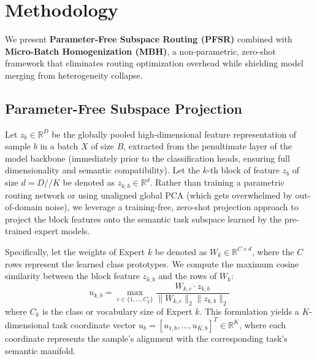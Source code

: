 \section{Methodology}
\label{sec:method}

We present \textbf{Parameter-Free Subspace Routing (PFSR)} combined with \textbf{Micro-Batch Homogenization (MBH)}, a non-parametric, zero-shot framework that eliminates routing optimization overhead while shielding model merging from heterogeneity collapse.

\subsection{Parameter-Free Subspace Projection}
Let $z_b \in \mathbb{R}^D$ be the globally pooled high-dimensional feature representation of sample $b$ in a batch $X$ of size $B$, extracted from the penultimate layer of the model backbone (immediately prior to the classification heads, ensuring full dimensionality and semantic compatibility). Let the $k$-th block of feature $z_b$ of size $d = D//K$ be denoted as $z_{k, b} \in \mathbb{R}^d$. Rather than training a parametric routing network or using unaligned global PCA (which gets overwhelmed by out-of-domain noise), we leverage a training-free, zero-shot projection approach to project the block features onto the semantic task subspace learned by the pre-trained expert models.

Specifically, let the weights of Expert $k$ be denoted as $W_k \in \mathbb{R}^{C \times d}$, where the $C$ rows represent the learned class prototypes. We compute the maximum cosine similarity between the block feature $z_{k, b}$ and the rows of $W_k$:
\begin{equation}
u_{k, b} = \max_{c \in \{1, \dots, C_k\}} \frac{W_{k, c} \cdot z_{k, b}}{\|W_{k, c}\|_2 \|z_{k, b}\|_2}
\label{eq:projection}
\end{equation}
where $C_k$ is the class or vocabulary size of Expert $k$. This formulation yields a $K$-dimensional task coordinate vector $u_b = [u_{1, b}, \dots, u_{K, b}]^T \in \mathbb{R}^K$, where each coordinate represents the sample's alignment with the corresponding task's semantic manifold. 

